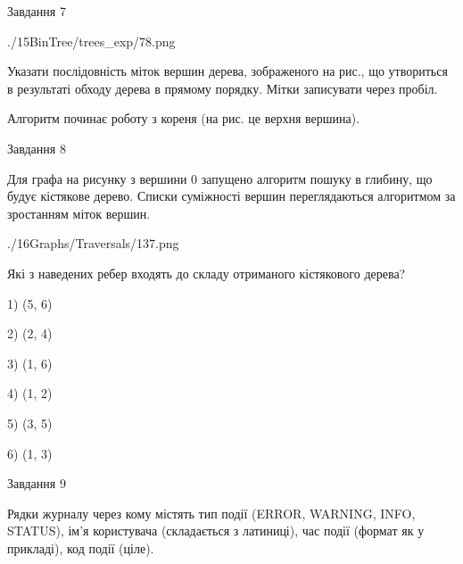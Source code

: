 \documentclass[12pt, ukrainian]{article}
\begin{document}
{\vspace{10mm}\par

\newpage
\begin{minipage}[t]{9.7cm}
               
{\begin{center}Завдання {7}\end{center}}
\vspace{-6mm}

\begin{center}
	{./15BinTree/trees_exp/78.png}
\end{center}
Указати послідовність міток вершин дерева, зображеного на рис., що утвориться в результаті обходу дерева в прямому порядку. Мітки записувати через пробіл.\par Алгоритм починає роботу з кореня (на рис. це верхня вершина).\par

\end{minipage}
\vline \hspace{8mm}
\begin{minipage}[t]{8.0cm}
               
{\begin{center}Завдання {8}\end{center}}
\vspace{-6mm}
Для графа на рисунку з вершини 0 запущено алгоритм пошуку в глибину, що будує кістякове дерево. Списки суміжності вершин переглядаються алгоритмом за зростанням міток вершин.\par
\begin{center}
	{./16Graphs/Traversals/137.png}
\end{center}
\par Які з наведених ребер входять до складу отриманого кістякового дерева?\par
1) (5, 6)\par
2) (2, 4)\par
3) (1, 6)\par
4) (1, 2)\par
5) (3, 5)\par
6) (1, 3)\par
{\vskip 15pt} \par

\end{minipage}

               
{\begin{center}Завдання {9}\end{center}}
\vspace{-6mm}
Рядки журналу через кому містять тип події (ERROR, WARNING, INFO, STATUS), ім'я користувача (складається з латиниці), час події (фор\-мат як у прикладі), код події (ціле).

}
\end{document}
